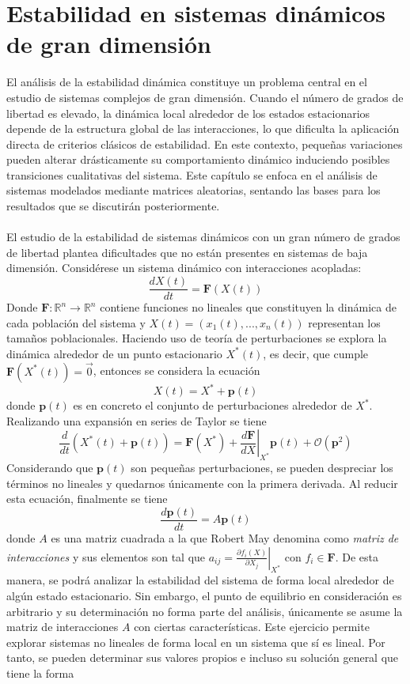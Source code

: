 \section{Estabilidad en sistemas dinámicos de gran dimensión}\label{sec:Antecedentes}
\setlength{\parindent}{0cm} El análisis de la estabilidad dinámica constituye un problema central en el estudio de sistemas complejos de gran dimensión. Cuando el número de grados de libertad es elevado, la dinámica local alrededor de los estados estacionarios depende de la estructura global de las interacciones, lo que dificulta la aplicación directa de criterios clásicos de estabilidad. En este contexto, pequeñas variaciones pueden alterar drásticamente su comportamiento dinámico induciendo posibles transiciones cualitativas del sistema. Este capítulo se enfoca en el análisis de sistemas modelados mediante matrices aleatorias, sentando las bases para los resultados que se discutirán posteriormente.
\\
\\
El estudio de la estabilidad de sistemas dinámicos con un gran número de grados de libertad plantea dificultades que no están presentes en sistemas de baja dimensión. Considérese un sistema dinámico con interacciones acopladas:
$$\frac{dX(t)}{dt}=\textbf{F}(X(t))$$
Donde $\textbf{F}:\mathbb{R}^n\to\mathbb{R}^n$ contiene funciones no lineales que constituyen la dinámica de cada población del sistema y $X(t)=(x_1(t),...,x_n(t))$ representan los tamaños poblacionales. Haciendo uso de teoría de perturbaciones \cite[p. 19]{may2019stability} se explora la dinámica alrededor de un punto estacionario $X^*(t)$, es decir, que cumple $\textbf{F}(X^*(t))=\vec{0}$, entonces se considera la ecuación
$$X(t)=X ^*+\textbf{p}(t)$$
donde $\textbf{p}(t)$ es en concreto el conjunto de perturbaciones alrededor de $X^*$. Realizando una expansión en series de Taylor se tiene 
$$\frac{d}{dt}\left (X^*(t)+\textbf{p}(t)\right )=\textbf{F}(X^*)+\left .\frac{d\textbf{F}}{dX}\right  |_{X^*}\textbf{p}(t)+\mathcal{O}(\textbf{p}^2)$$
Considerando que $\textbf{p}(t)$ son pequeñas perturbaciones, se pueden despreciar los términos no lineales y quedarnos únicamente con la primera derivada. Al reducir esta ecuación, finalmente se tiene 
$$\frac{d\textbf{p}(t)}{dt}=A\textbf{p}(t)$$
donde $A$ es una matriz cuadrada a la que Robert May denomina como \textit{matriz de interacciones} y sus elementos son tal que $a_{ij}=\left .\frac{\partial f_i(X)}{\partial X_j}\right |_{X^*}$ con $f_i\in\textbf{F}$. De esta manera, se podrá analizar la estabilidad del sistema de forma local alrededor de algún estado estacionario. Sin embargo, el punto de equilibrio en consideración es arbitrario y su determinación no forma parte del análisis, únicamente se asume la matriz de interacciones $A$ con ciertas características. Este ejercicio permite explorar sistemas no lineales de forma local en un sistema que sí es lineal. Por tanto, se pueden determinar sus valores propios e incluso su solución general que tiene la forma \cite{hirsch2013differential}
